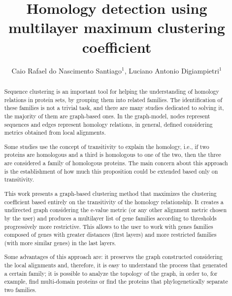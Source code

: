 \documentclass[twoside]{article}
\title{\vspace{-15mm}\fontsize{24pt}{10pt}\selectfont\textbf{Homology detection using multilayer maximum clustering coefficient}} %
\author{Caio Rafael do Nascimento Santiago$^1$, Luciano Antonio Digiampietri$^1$}
\affil{1 USP\\ }
\date{}
\begin{document}
\maketitle %

\thispagestyle{fancy} %


\begin{abstract}
Sequence clustering is an important tool for helping the understanding of homology relations in protein sets, by grouping them into related families. The identification of these families is not a trivial task, and there are many studies dedicated to solving it, the majority of them are graph-based ones. In the graph-model, nodes represent sequences and edges represent homology relations, in general, defined considering metrics obtained from local alignments.

Some studies use the concept of transitivity to explain the homology, i.e., if two proteins are homologous and a third is homologous to one of the two, then the three are considered a family of homologous proteins. The main concern about this approach is the establishment of how much this proposition could be extended based only on transitivity.

This work presents a graph-based clustering method that maximizes the clustering coefficient based entirely on the transitivity of the homology relationship. It creates a undirected graph considering the e-value metric (or any other alignment metric chosen by the user) and produces a multilayer list of gene families according to thresholds progressively more restrictive. This allows to the user to work with genes families composed of genes with greater distances (first layers) and more restricted families (with more similar genes) in the last layers.

Some advantages of this approach are: it preserves the graph constructed considering the local alignments and, therefore, it is easy to understand the process that generated a certain family; it is possible to analyze the topology of the graph, in order to, for example, find multi-domain proteins or find the proteins that phylogenetically separate two families. 


\end{abstract}
\end{document}
